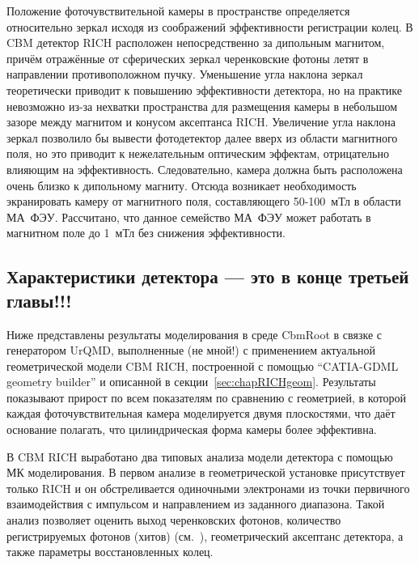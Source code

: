 
Положение фоточувствительной камеры в пространстве определяется относительно зеркал исходя из соображений эффективности регистрации колец. В CBM детектор RICH расположен непосредственно за дипольным магнитом, причём отражённые от сферических зеркал черенковские фотоны летят в направлении противоположном пучку. Уменьшение угла наклона зеркал теоретически приводит к повышению эффективности детектора, но на практике невозможно из-за нехватки пространства для размещения камеры в небольшом зазоре между магнитом и конусом аксептанса RICH. Увеличение угла наклона зеркал позволило бы вывести фотодетектор далее вверх из области магнитного поля, но это приводит к нежелательным оптическим эффектам, отрицательно влияющим на эффективность. Следовательно, камера должна быть расположена очень близко к дипольному магниту. Отсюда возникает необходимость экранировать камеру от магнитного поля, составляющего 50-100~мТл в области МА~ФЭУ. Рассчитано, что данное семейство МА~ФЭУ может работать в магнитном поле до 1~мТл без снижения эффективности.

\todo
\subsection{Характеристики детектора --- это в конце третьей главы!!!}

Ниже представлены результаты моделирования в среде CbmRoot в связке с генератором UrQMD, выполненные (\todo не мной!) с применением актуальной геометрической модели CBM RICH, построенной с помощью ``CATIA-GDML geometry builder'' и описанной в секции~\ref{sec:chapRICHgeom}.
Результаты показывают прирост по всем показателям по сравнению с геометрией, в которой каждая фоточувствительная камера моделируется двумя плоскостями, что даёт основание полагать, что цилиндрическая форма камеры более эффективна.

В CBM RICH выработано два типовых анализа модели детектора с помощью МК моделирования. В первом анализе в геометрической установке присутствует только RICH и он обстреливается одиночными электронами из точки первичного взаимодействия с импульсом и направлением из заданного диапазона. Такой анализ позволяет оценить выход черенковских фотонов, количество регистрируемых фотонов (хитов) (см.~), геометрический аксептанс детектора, а также параметры восстановленных колец.

